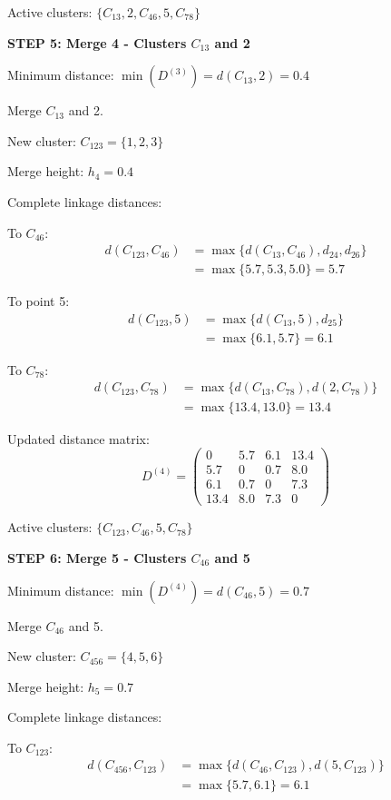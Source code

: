 \documentclass[12pt]{article}
\begin{document}
\begin{solution}
Active clusters: $\{C_{13}, 2, C_{46}, 5, C_{78}\}$

\textbf{STEP 5: Merge 4 - Clusters $C_{13}$ and 2}

Minimum distance: $\min(D^{(3)}) = d(C_{13}, 2) = 0.4$

Merge $C_{13}$ and 2.

New cluster: $C_{123} = \{1, 2, 3\}$

Merge height: $h_4 = 0.4$

Complete linkage distances:

To $C_{46}$:
\begin{align*}
d(C_{123}, C_{46}) &= \max\{d(C_{13}, C_{46}), d_{24}, d_{26}\} \\
&= \max\{5.7, 5.3, 5.0\} = 5.7
\end{align*}

To point 5:
\begin{align*}
d(C_{123}, 5) &= \max\{d(C_{13}, 5), d_{25}\} \\
&= \max\{6.1, 5.7\} = 6.1
\end{align*}

To $C_{78}$:
\begin{align*}
d(C_{123}, C_{78}) &= \max\{d(C_{13}, C_{78}), d(2, C_{78})\} \\
&= \max\{13.4, 13.0\} = 13.4
\end{align*}

Updated distance matrix:
\[
D^{(4)} = \begin{pmatrix}
0 & 5.7 & 6.1 & 13.4 \\
5.7 & 0 & 0.7 & 8.0 \\
6.1 & 0.7 & 0 & 7.3 \\
13.4 & 8.0 & 7.3 & 0
\end{pmatrix}
\]

Active clusters: $\{C_{123}, C_{46}, 5, C_{78}\}$

\textbf{STEP 6: Merge 5 - Clusters $C_{46}$ and 5}

Minimum distance: $\min(D^{(4)}) = d(C_{46}, 5) = 0.7$

Merge $C_{46}$ and 5.

New cluster: $C_{456} = \{4, 5, 6\}$

Merge height: $h_5 = 0.7$

Complete linkage distances:

To $C_{123}$:
\begin{align*}
d(C_{456}, C_{123}) &= \max\{d(C_{46}, C_{123}), d(5, C_{123})\} \\
&= \max\{5.7, 6.1\} = 6.1
\end{align*}


\end{solution}
\end{document}
